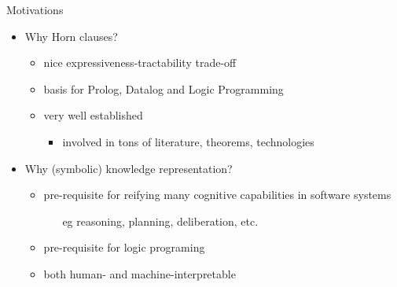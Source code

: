 \documentclass[presentation]{beamer}\mode<presentation>{\usetheme{AMSBolognaFC}}
\begin{document}
\begin{frame}{Motivations}
    \begin{itemize}
        \item Why Horn clauses?
        \begin{itemize}
            \item nice expressiveness-tractability trade-off
            \item basis for Prolog, Datalog and Logic Programming
            \item very well established
            \begin{itemize}
                \item involved in tons of literature, theorems, technologies
            \end{itemize}
        \end{itemize}

        \vfill

        \item Why (symbolic) knowledge representation?
        \begin{itemize}
            \item pre-requisite for reifying many cognitive capabilities in software systems
            \begin{itemize}
                \item[eg] reasoning, planning, deliberation, etc.
            \end{itemize}
            \item pre-requisite for logic programing
            \item both human- and machine-interpretable
        \end{itemize}
    \end{itemize}
\end{frame}
\end{document}
